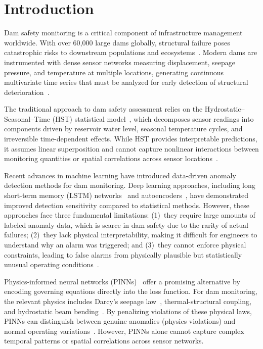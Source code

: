 \documentclass[preprint,12pt,review]{elsarticle}
\begin{document}
\section{Introduction}
\label{sec:intro}

Dam safety monitoring is a critical component of infrastructure management worldwide. With over 60{,}000 large dams globally, structural failure poses catastrophic risks to downstream populations and ecosystems~\cite{ICOLD2018}. Modern dams are instrumented with dense sensor networks measuring displacement, seepage pressure, and temperature at multiple locations, generating continuous multivariate time series that must be analyzed for early detection of structural deterioration~\cite{li2020review}.

The traditional approach to dam safety assessment relies on the Hydrostatic--Seasonal--Time (HST) statistical model~\cite{mata2011interpretation}, which decomposes sensor readings into components driven by reservoir water level, seasonal temperature cycles, and irreversible time-dependent effects. While HST provides interpretable predictions, it assumes linear superposition and cannot capture nonlinear interactions between monitoring quantities or spatial correlations across sensor locations~\cite{salazar2017empirical,salazar2015data}.

Recent advances in machine learning have introduced data-driven anomaly detection methods for dam monitoring. Deep learning approaches, including long short-term memory (LSTM) networks~\cite{hochreiter1997long} and autoencoders~\cite{chen2021deep}, have demonstrated improved detection sensitivity compared to statistical methods. However, these approaches face three fundamental limitations: (1)~they require large amounts of labeled anomaly data, which is scarce in dam safety due to the rarity of actual failures; (2)~they lack physical interpretability, making it difficult for engineers to understand why an alarm was triggered; and (3)~they cannot enforce physical constraints, leading to false alarms from physically plausible but statistically unusual operating conditions~\cite{zhang2023physics,bao2021machine}.

Physics-informed neural networks (PINNs)~\cite{raissi2019physics,karniadakis2021physics} offer a promising alternative by encoding governing equations directly into the loss function. For dam monitoring, the relevant physics includes Darcy's seepage law~\cite{bear1972dynamics}, thermal-structural coupling, and hydrostatic beam bending~\cite{biot1941general}. By penalizing violations of these physical laws, PINNs can distinguish between genuine anomalies (physics violations) and normal operating variations~\cite{haghighat2021physics}. However, PINNs alone cannot capture complex temporal patterns or spatial correlations across sensor networks.
\end{document}
